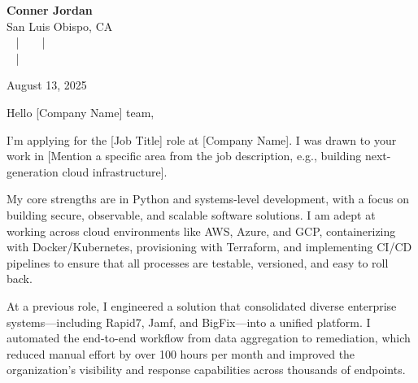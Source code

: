 \documentclass[letterpaper,11pt]{article}
\begin{document}
\begin{center}
  {\Huge \textbf{Conner Jordan}}\\[4pt]
  {\Large San Luis Obispo, CA}\\[4pt]
  \href{tel:+18059759793}{
    } ~ | ~
  \href{mailto:connercharlesjordan@gmail.com}{
    } ~ | ~
   \\
  \href{https://www.linkedin.com/in/conner-jordan-4b268514a/}{
    } ~ | ~
  \href{https://github.com/cjordan223}{
    }
\end{center}



\vspace{16pt}

\begin{flushright}
August 13, 2025
\end{flushright}

\noindent
Hello [Company Name] team,

\vspace{16pt}

I'm applying for the [Job Title] role at [Company Name]. I was drawn to your work in [Mention a specific area from the job description, e.g., building next-generation cloud infrastructure].

My core strengths are in Python and systems-level development, with a focus on building secure, observable, and scalable software solutions. I am adept at working across cloud environments like AWS, Azure, and GCP, containerizing with Docker/Kubernetes, provisioning with Terraform, and implementing CI/CD pipelines to ensure that all processes are testable, versioned, and easy to roll back.

\vspace{16pt}

At a previous role, I engineered a solution that consolidated diverse enterprise systems—including Rapid7, Jamf, and BigFix—into a unified platform. I automated the end-to-end workflow from data aggregation to remediation, which reduced manual effort by over 100 hours per month and improved the organization's visibility and response capabilities across thousands of endpoints.
\end{document}
